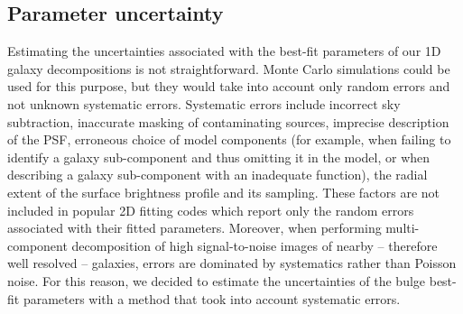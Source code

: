 \documentclass[preprint2]{emulateapj}
\begin{document}
\subsection{Parameter uncertainty}
\label{sec:err}
Estimating the uncertainties associated with the best-fit parameters of our 1D galaxy decompositions is not straightforward.
Monte Carlo simulations could be used for this purpose, 
but they would take into account only random errors and not unknown systematic errors.
Systematic errors include incorrect sky subtraction, 
inaccurate masking of contaminating sources, 
imprecise description of the PSF, 
erroneous choice of model components 
(for example, when failing to identify a galaxy sub-component and thus omitting it in the model, 
or when describing a galaxy sub-component with an inadequate function),
the radial extent of the surface brightness profile and its sampling.
These factors are not included in popular 2D fitting codes which report only the random errors associated with their fitted parameters.  
Moreover, when performing multi-component decomposition of high signal-to-noise images of nearby -- therefore well resolved -- galaxies, 
errors are dominated by systematics rather than Poisson noise.
For this reason, we decided to estimate the uncertainties of the bulge best-fit parameters 
with a method that took into account systematic errors. 
\end{document}
